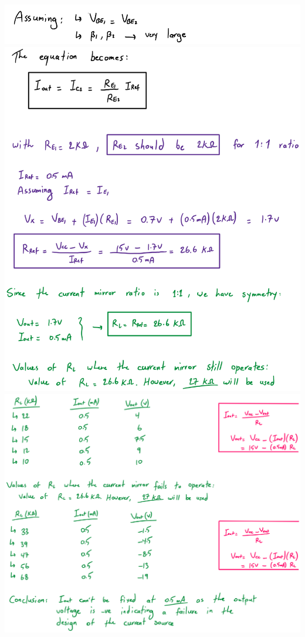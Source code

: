 \documentclass{article}
\begin{document}
	\includegraphics[width=\linewidth]{prelab9.png}
	\includegraphics[width=\linewidth]{prelab10.png}
	\includegraphics[width=\linewidth]{prelab11.png}
\end{document}
